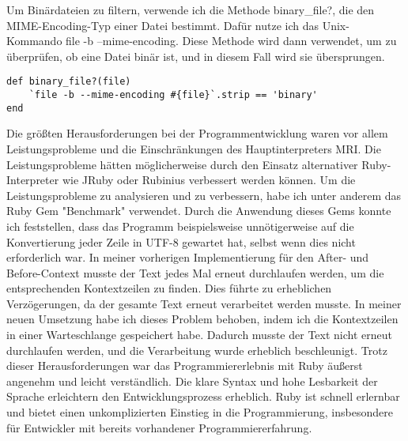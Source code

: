 \documentclass{article}
\begin{document}
Um Binärdateien zu filtern, verwende ich die Methode binary\_file?, die den MIME-Encoding-Typ einer Datei bestimmt. Dafür nutze ich das Unix-Kommando file -b --mime-encoding. Diese Methode wird dann verwendet, um zu überprüfen, ob eine Datei binär ist, und in diesem Fall wird sie übersprungen. 
\begin{lstlisting}
def binary_file?(file)
    `file -b --mime-encoding #{file}`.strip == 'binary'
end
\end{lstlisting}
Die größten Herausforderungen bei der Programmentwicklung waren vor allem Leistungsprobleme und die Einschränkungen des Hauptinterpreters MRI. Die Leistungsprobleme hätten möglicherweise durch den Einsatz alternativer Ruby-Interpreter wie JRuby oder Rubinius verbessert werden können.
Um die Leistungsprobleme zu analysieren und zu verbessern, habe ich unter anderem das Ruby Gem "Benchmark" verwendet. Durch die Anwendung dieses Gems konnte ich feststellen, dass das Programm beispielsweise unnötigerweise auf die Konvertierung jeder Zeile in UTF-8 gewartet hat, selbst wenn dies nicht erforderlich war.
In meiner vorherigen Implementierung für den After- und Before-Context musste der Text jedes Mal erneut durchlaufen werden, um die entsprechenden Kontextzeilen zu finden. Dies führte zu erheblichen Verzögerungen, da der gesamte Text erneut verarbeitet werden musste. In meiner neuen Umsetzung habe ich dieses Problem behoben, indem ich die Kontextzeilen in einer Warteschlange gespeichert habe. Dadurch musste der Text nicht erneut durchlaufen werden, und die Verarbeitung wurde erheblich beschleunigt.
Trotz dieser Herausforderungen war das Programmiererlebnis mit Ruby äußerst angenehm und leicht verständlich. Die klare Syntax und hohe Lesbarkeit der Sprache erleichtern den Entwicklungsprozess erheblich. Ruby ist schnell erlernbar und bietet einen unkomplizierten Einstieg in die Programmierung, insbesondere für Entwickler mit bereits vorhandener Programmiererfahrung.
\end{document}

